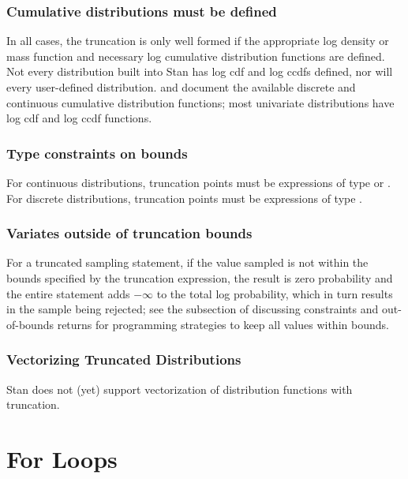 \subsubsection{Cumulative distributions must be defined}

In all cases, the truncation is only well formed if the appropriate
log density or mass function and necessary log cumulative distribution
functions are defined.  Not every distribution built into Stan has log
cdf and log ccdfs defined, nor will every user-defined distribution.
 and
 document the available discrete
and continuous cumulative distribution functions; most univariate
distributions have log cdf and log ccdf functions.


\subsubsection{Type constraints on bounds}

For continuous distributions, truncation points must be expressions of
type  or .  For discrete distributions, truncation
points must be expressions of type .

\subsubsection{Variates outside of truncation bounds}

For a truncated sampling statement, if the value sampled is not within
the bounds specified by the truncation expression, the result is zero
probability and the entire statement adds $-\infty$ to the total log
probability, which in turn results in the sample being rejected; see
the subsection of  discussing constraints
and out-of-bounds returns for programming strategies to keep
all values within bounds.

\subsubsection{Vectorizing Truncated Distributions}

Stan does not (yet) support vectorization of distribution functions
with truncation.


\section{For Loops}

